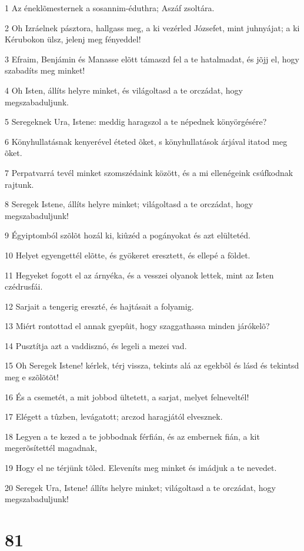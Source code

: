 \par 1 Az éneklõmesternek a sosannim-éduthra; Aszáf zsoltára.
\par 2 Oh Izráelnek pásztora, hallgass meg, a ki vezérled Józsefet, mint juhnyájat; a ki Kérubokon ülsz, jelenj meg fényeddel!
\par 3 Efraim, Benjámin és Manasse elõtt támaszd fel a te hatalmadat, és jõjj el, hogy szabadíts meg minket!
\par 4 Oh Isten, állíts helyre minket, és világoltasd a te orczádat, hogy megszabaduljunk.
\par 5 Seregeknek Ura, Istene: meddig haragszol a te népednek könyörgésére?
\par 6 Könyhullatásnak kenyerével éteted õket, s könyhullatások árjával itatod meg õket.
\par 7 Perpatvarrá tevél minket szomszédaink között, és a mi ellenégeink csúfkodnak rajtunk.
\par 8 Seregek Istene, állíts helyre minket; világoltasd a te orczádat, hogy megszabaduljunk!
\par 9 Égyiptomból szõlõt hozál ki, kiûzéd a pogányokat és azt elültetéd.
\par 10 Helyet egyengettél elõtte, és gyökeret eresztett, és ellepé a földet.
\par 11 Hegyeket fogott el az árnyéka, és a vesszei olyanok lettek, mint az Isten czédrusfái.
\par 12 Sarjait a tengerig ereszté, és hajtásait a folyamig.
\par 13 Miért rontottad el annak gyepûit, hogy szaggathassa minden járókelõ?
\par 14 Pusztítja azt a vaddisznó, és legeli a mezei vad.
\par 15 Oh Seregek Istene! kérlek, térj vissza, tekints alá az egekbõl és lásd és tekintsd meg e szõlõtõt!
\par 16 És a csemetét, a mit jobbod ültetett, a sarjat, melyet felneveltél!
\par 17 Elégett a tûzben, levágatott; arczod haragjától elvesznek.
\par 18 Legyen a te kezed a te jobbodnak férfián, és az embernek fián, a kit megerõsítettél magadnak,
\par 19 Hogy el ne térjünk tõled. Eleveníts meg minket és imádjuk a te nevedet.
\par 20 Seregek Ura, Istene! állíts helyre minket; világoltasd a te orczádat, hogy megszabaduljunk!

\chapter{81}

